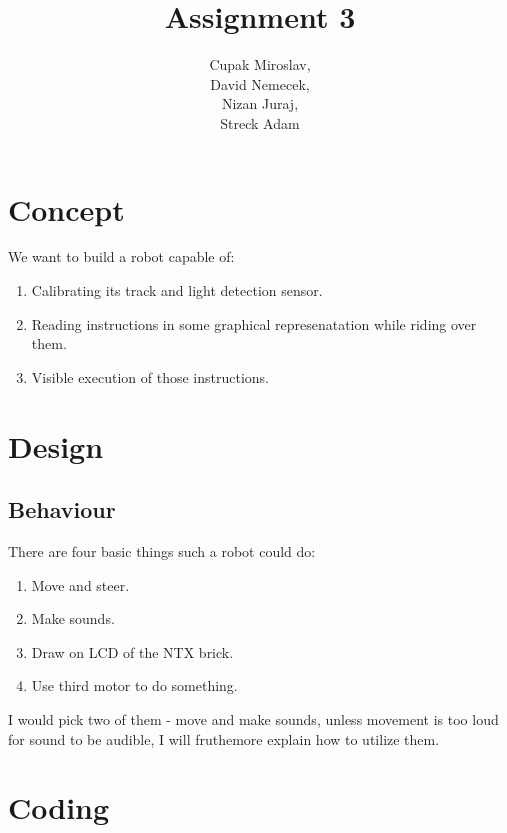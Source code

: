 \documentclass{article}
\title{Assignment 3}
\begin{document}
\author{Cupak Miroslav,\\
        David Nemecek,\\
		Nizan Juraj, \\
		Streck Adam}
\maketitle

\section{Concept}
We want to build a robot capable of:
\begin {enumerate}
\item Calibrating its track and light detection sensor.
\item Reading instructions in some graphical represenatation while riding over them.
\item Visible execution of those instructions.
\end {enumerate}

\section{Design}

\subsection{Behaviour}
There are four basic things such a robot could do:
\begin{enumerate}
\item Move and steer.
\item Make sounds.
\item Draw on LCD of the NTX brick.
\item Use third motor to do something.
\end{enumerate}
I would pick two of them - move and make sounds, unless movement is too loud for sound to be audible, I will fruthemore explain how to utilize them.







\section{Coding}










\end{document}
